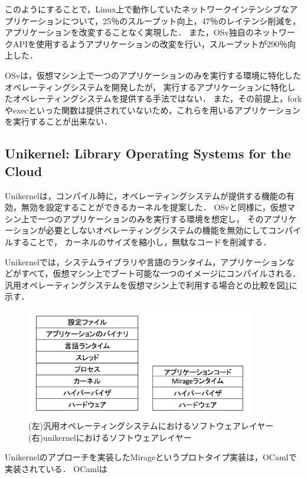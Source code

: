 \documentclass[graduation-thesis]{mlarticle}
\begin{document}
このようにすることで，Linux上で動作していたネットワークインテンシブなアプリケーションについて，25％のスループット向上，47％のレイテンシ削減を，アプリケーションを改変することなく実現した．
また，OSv独自のネットワークAPIを使用するようアプリケーションの改変を行い，スループットが290％向上した．

OSvは，仮想マシン上で一つのアプリケーションのみを実行する環境に特化したオペレーティングシステムを開発したが，
実行するアプリケーションに特化したオペレーティングシステムを提供する手法ではない．
また，その前提上，forkやexecといった関数は提供されていないため，これらを用いるアプリケーションを実行することが出来ない．


\subsection {Unikernel: Library Operating Systems for the Cloud}
\label{relative:unikernel}
Unikernelは，コンパイル時に，オペレーティングシステムが提供する機能の有効，無効を設定することができるカーネルを提案した．
OSvと同様に，仮想マシン上で一つのアプリケーションのみを実行する環境を想定し，
そのアプリケーションが必要としないオペレーティングシステムの機能を無効にしてコンパイルすることで，
カーネルのサイズを縮小し，無駄なコードを削減する．

Unikernelでは，システムライブラリや言語のランタイム，アプリケーションなどがすべて，仮想マシン上でブート可能な一つのイメージにコンパイルされる．
汎用オペレーティングシステムを仮想マシン上で利用する場合との比較を図\ref{fig:unikernel}に示す．

\begin{figure}[H]
  \begin{center}
    \includegraphics[width=10.0cm]{images/unikernel.png}
    \caption{(左)汎用オペレーティングシステムにおけるソフトウェアレイヤー (右)unikernelにおけるソフトウェアレイヤー}
    \label{fig:unikernel}
  \end{center}
\end{figure}

Unikernelのアプローチを実装したMirageというプロトタイプ実装は，OCamlで実装されている．
OCamlは
\end{document}
